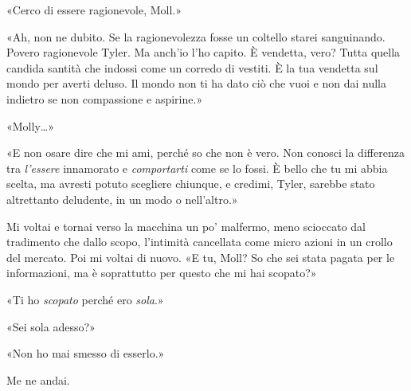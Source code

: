 «Cerco di essere ragionevole, Moll.»

«Ah, non ne dubito. Se la ragionevolezza fosse un coltello starei
sanguinando. Povero ragionevole Tyler. Ma anch'io l'ho capito. È
vendetta, vero? Tutta quella candida santità che indossi come un corredo
di vestiti. È la tua vendetta sul mondo per averti deluso. Il mondo non
ti ha dato ciò che vuoi e non dai nulla indietro se non compassione e
aspirine.»

«Molly\ldots»

«E non osare dire che mi ami, perché so che non è vero. Non conosci la
differenza tra \emph{l'essere} innamorato e \emph{comportarti} come se
lo fossi. È bello che tu mi abbia scelta, ma avresti potuto scegliere
chiunque, e credimi, Tyler, sarebbe stato altrettanto deludente, in un
modo o nell'altro.»

Mi voltai e tornai verso la macchina un po' malfermo, meno scioccato dal
tradimento che dallo scopo, l'intimità cancellata come micro azioni in
un crollo del mercato. Poi mi voltai di nuovo. «E tu, Moll? So che sei
stata pagata per le informazioni, ma è soprattutto per questo che mi hai
scopato?»

«Ti ho \emph{scopato} perché ero \emph{sola}.»

«Sei sola adesso?»

«Non ho mai smesso di esserlo.»

Me ne andai.